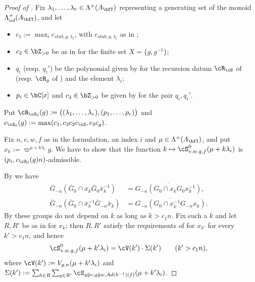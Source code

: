 \documentclass[12pt,a4paper]{amsart}%
\newcommand{\DimaA}[1]{{{#1}}}
\begin{document}
\begin{proof}[Proof of ]
Fix $\lambda_1,\dots,\lambda_r\in\Lambda^+(A_\bfT)$ representing a generating set of the monoid $\Lambda^+_{ad}(A_\bfT)$, and let
\begin{itemize}
\item $c_1:=\max_{i}c_{stab,g,\lambda_i}$, with $c_{stab,g,\lambda_i}$ as in ;
\item $c_2\in\Z_{>0}$ be as in  for the finite set $X=\{g,g^{-1}\}$;
\item $q_i$ (resp. $q_i'$) be the polynomial given by  for the recursion datum $\cR_{\cS}$ of  (resp. $\cR_g$ of ) and the element $\lambda_i$;
\item $p_i\in\C[x]$ and $c_3\in\Z_{>0}$ be given by  for the pair $q_i,q_i'$.
\end{itemize}
Put $\cR_{\cS_0}(g):=\bigl((\lambda_1,\dots,\lambda_r),(p_1,\dots,p_r)\bigr)$ and $c_{\cS_0}(g):=\max(c_1,c_3c_2c_{\cS},c_3c_g)$.

Fix $n,v,w,f$ as in the formulation, an index $i$ and $\mu\in\Lambda^+(A_\bfT)$, and put $x_k:=\varpi^{\mu+k\lambda_i}g$. We have to show that the function $k\mapsto \cS^0_{v,w,g,f}(\mu+k\lambda_i)$ is $(p_i,c_{\cS_0}(g)n)$-admissible.

By  \DimaA{we have}
\begin{align*}
\bar G_{-n}(\bar G_0\cap \bar x_k\bar G_0\bar x_k^{-1})&=\overline{G_{-n}(G_0\cap x_kG_0x_k^{-1})},\\
\bar G_{-n}(\bar G_0\cap \bar x_k^{-1}\bar G_{-n}\bar x_k)&=\overline{G_{-n}(G_0\cap x_k^{-1}G_{-n}x_k)}.
\end{align*}
\DimaA{By  these groups do not depend on $k$ as long as $k>c_1n$}. Fix such a $k$ and let $R,R'$ be as in  for $x_{k}$; then $R,R'$ satisfy the requirements of  for $x_{k'}$ for every $k'>c_1n$, and hence
\begin{equation}\label{prop:adm.int:1}
\cS^0_{v,w,g,f}(\mu+k'\lambda_i)=\cV(k')\cdot\Sigma(k')\qquad(k'>c_1n),
\end{equation}
where $\cV(k'):=V_{g,n}(\mu+k'\lambda_i)$ and $\Sigma(k'):=\sum_{h\in R}\sum_{y\in R'}\cS_{g\tilde yv,g\tilde yw,Ad(h^{-1})(f)}(\mu+k'\lambda_i)$.


\end{proof}
\end{document}
